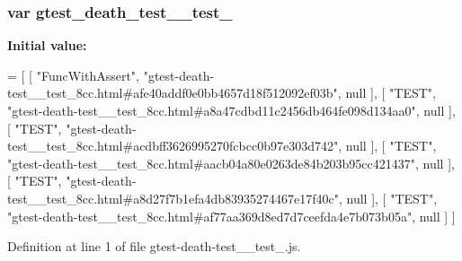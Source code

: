 \subsubsection[{\texorpdfstring{gtest\+\_\+death\+\_\+test\+\_\+\+\_\+test\+\_\+8cc}{gtest_death_test__test_8cc}}]{\setlength{\rightskip}{0pt plus 5cm}var gtest\+\_\+death\+\_\+test\+\_\+\+\_\+test\+\_}\hypertarget{gtest-death-test____test__8cc_8js_a939f5bb1032469d8e29a77196a744956}{}\label{gtest-death-test____test__8cc_8js_a939f5bb1032469d8e29a77196a744956}
{\bfseries Initial value\+:}
\begin{DoxyCode}
=
[
    [ \textcolor{stringliteral}{"FuncWithAssert"}, \textcolor{stringliteral}{"gtest-death-test\_\_test\_8cc.html#afe40addf0e0bb4657d18f512092ef03b"}, null ],
    [ \textcolor{stringliteral}{"TEST"}, \textcolor{stringliteral}{"gtest-death-test\_\_test\_8cc.html#a8a47cdbd11c2456db464fe098d134aa0"}, null ],
    [ \textcolor{stringliteral}{"TEST"}, \textcolor{stringliteral}{"gtest-death-test\_\_test\_8cc.html#acdbff3626995270fcbcc0b97e303d742"}, null ],
    [ \textcolor{stringliteral}{"TEST"}, \textcolor{stringliteral}{"gtest-death-test\_\_test\_8cc.html#aacb04a80e0263de84b203b95cc421437"}, null ],
    [ \textcolor{stringliteral}{"TEST"}, \textcolor{stringliteral}{"gtest-death-test\_\_test\_8cc.html#a8d27f7b1efa4db83935274467e17f40c"}, null ],
    [ \textcolor{stringliteral}{"TEST"}, \textcolor{stringliteral}{"gtest-death-test\_\_test\_8cc.html#af77aa369d8ed7d7ceefda4e7b073b05a"}, null ]
]
\end{DoxyCode}


Definition at line 1 of file gtest-\/death-\/test\+\_\+\+\_\+test\+\_.\+js.

